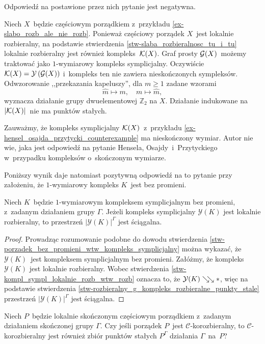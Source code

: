 Odpowiedź na postawione przez nich pytanie jest negatywna. 

\begin{ex}\label{ex-hensel_osajda_przytycki_counterexample}
Niech $X$~będzie częściowym porządkiem z~przykładu \ref{ex-slabo_rozb_ale_nie_rozb}. Ponieważ częściowy porządek $X$~jest lokalnie rozbieralny, na podstawie stwierdzenia \ref{stw-slaba_rozbieralnosc_tu_i_tu} lokalnie rozbieralny jest również kompleks~$\mathcal{K}(X)$. Graf prosty $\mathcal{G}(X)$~możemy traktować jako $1$-wymiarowy kompleks symplicjalny. Oczywiście $\mathcal{K}(X)=\mathcal{Y}\left(\mathcal{G}(X)\right)$ i~kompleks ten nie zawiera nieskończonych sympleksów.  Odwzorowanie ,,przekazania kapeluszy'', dla $m\geq 1$ zadane wzorami \[\widehat{m}\mapsto m,\quad m\mapsto \widehat{m},\] wyznacza działanie grupy dwuelementowej $\mathbb{Z}_2$ na $X$. Działanie indukowane na $|\mathcal{K}(X)|$~nie ma punktów stałych.
\end{ex}

Zauważmy, że kompleks symplicjalny $\mathcal{K}(X)$~z~przykładu \ref{ex-hensel_osajda_przytycki_counterexample} ma nieskończony wymiar. Autor nie wie, jaka jest odpowiedź na pytanie Hensela, Osajdy~i~Przytyckiego \cite[Question 2.11]{Hensel14} w~przypadku kompleksów o~skończonym wymiarze. 

Poniższy wynik daje natomiast pozytywną odpowiedź na to pytanie przy założeniu, że $1$-wymiarowy kompleks $K$~jest bez promieni.

\begin{stw}
Niech $K$~będzie $1$-wymiarowym kompleksem symplicjalnym bez promieni, z~zadanym działaniem grupy $\Gamma$. Jeżeli kompleks symplicjalny $\mathcal{Y}(K)$ jest lokalnie rozbieralny, to przestrzeń $|\mathcal{Y}(K)|^\Gamma$ jest ściągalna.
\end{stw}
\begin{proof}
Prowadząc rozumowanie podobne do dowodu stwierdzenia \ref{stw-porzadek_bez_promieni_wtw_kompleks_symplicjalny} można wykazać, że $\mathcal{Y}(K)$~jest kompleksem symplicjalnym bez promieni. Załóżmy, że kompleks $\mathcal{Y}(K)$ jest lokalnie rozbieralny. Wobec stwierdzenia \ref{stw-kompl_sympl_lokalnie_rozb_wtw_rozb} oznacza to, że $\mathcal{Y}(K)\searrow\!\!\searrow *$, więc na podstawie stwierdzenia \ref{stw-rozbieralny_g_kompleks_rozbieralne_punkty_stale} przestrzeń $|\mathcal{Y}(K)|^\Gamma$ jest ściągalna.
\end{proof}

\begin{problem}\label{prob9}
Niech $P$~będzie lokalnie skończonym częściowym porządkiem z~zadanym działaniem skończonej grupy $\Gamma$. Czy jeśli porządek $P$~jest \mbox{$\mathcal{C}$-korozbieralny}, to $\mathcal{C}$-korozbieralny jest również zbiór punktów stałych $P^\Gamma$ działania $\Gamma$~na~$P$?
\end{problem}

